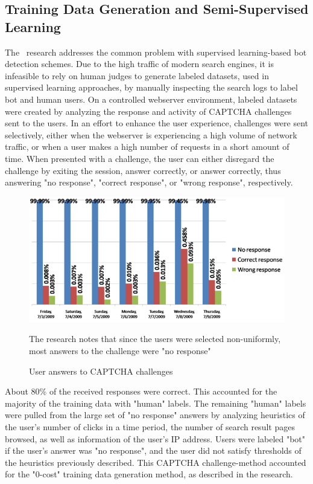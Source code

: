 \subsection{Training Data Generation and Semi-Supervised Learning}\label{subsec:training-data-generation-and-semi-supervised-learning}
The~\cite{bot_detection_for_search_engines} research addresses the common problem with supervised learning-based bot detection schemes.
Due to the high traffic of modern search engines, it is infeasible to rely on human judges to generate labeled datasets, used in supervised learning approaches, by manually inspecting the search logs to label bot and human users.
On a controlled webserver environment, labeled datasets were created by analyzing the response and activity of CAPTCHA challenges sent to the users.
In an effort to enhance the user experience, challenges were sent selectively, either when the webserver is experiencing a high volume of network traffic, or when a user makes a high number of requests in a short amount of time.
When presented with a challenge, the user can either disregard the challenge by exiting the session, answer correctly, or answer correctly, thus answering "no response", "correct response", or "wrong response", respectively.
\begin{figure}[!h]
    \centering
    \includegraphics[width=1\columnwidth]{figures/semi_supervised_CAPTCHA_training_data_generation_results}
    \caption{User answers to CAPTCHA challenges}
    \label{fig:captcha-user-answers}
    {\small The research notes that since the users were selected non-uniformly, most answers to the challenge were "no response"}
\end{figure}
About 80\% of the received responses were correct.
This accounted for the majority of the training data with "human" labels.
The remaining "human" labels were pulled from the large set of "no response" answers by analyzing heuristics of the user's number of clicks in a time period, the number of search result pages browsed, as well as information of the user's IP address.
Users were labeled "bot" if the user's answer was "no response", and the user did not satisfy thresholds of the heuristics previously described.
This CAPTCHA challenge-method accounted for the "0-cost" training data generation method, as described in the research.

